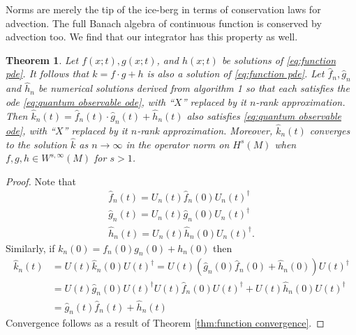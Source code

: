 \documentclass[12pt]{amsart}
\newtheorem{thm}{Theorem}[section]
\begin{document}
Norms are merely the tip of the ice-berg in terms of conservation laws for advection.
The full Banach algebra of continuous function is conserved by advection too.
We find that our integrator has this property as well.
\begin{thm} \label{thm:algebra}
	Let $f(x;t),g(x;t)$, and $h(x;t)$ be solutions of \eqref{eq:function pde}.
	It follows that $k= f \cdot g + h $ is also a solution of \eqref{eq:function pde}.
	Let $\hat{f}_{n}, \hat{g}_{n}$ and $\hat{h}_{n}$ be numerical solutions derived from algorithm 1
	so that each satisfies the ode \eqref{eq:quantum observable ode}, with ``$X$'' replaced by it $n$-rank approximation.
	Then $\hat{k}_{n}(t) = \hat{f}_{n}(t) \cdot \hat{g}_{n}(t) + \hat{h}_{n}(t)$ also satisfies \eqref{eq:quantum observable ode}, with ``$X$'' replaced by it $n$-rank approximation.
	Moreover, $\hat{k}_{n}(t)$ converges to the solution $\hat{k}$ as $n \to \infty$ in the operator norm on $H^{s}(M)$ when $f,g,h \in W^{s,\infty}(M)$ for $s>1$.
\end{thm}
\begin{proof}
	Note that 
	\begin{align}
		\hat{f}_{n}(t) = U_{n}(t) \hat{f}_{n}(0) U_{n}(t)^{\dagger} \\
		\hat{g}_{n}(t) = U_{n}(t) \hat{g}_{n}(0) U_{n}(t)^{\dagger} \\
		\hat{h}_{n}(t) = U_{n}(t) \hat{h}_{n}(0) U_{n}(t)^{\dagger}.
	\end{align}
	Similarly, if $k_{n}(0) = f_{n}(0) g_{n}(0) + h_{n}(0)$ then
	\begin{align}
		\hat{k}_{n}(t) &= U(t) \hat{k}_{n}(0) U(t)^{\dagger} = U(t)\left( \hat{g}_{n}(0) \hat{f}_{n}(0) + \hat{h}_{n}(0) \right) U(t)^{\dagger} \\
			&= U(t) \hat{g}_{n}(0) U(t)^{\dagger} U(t) \hat{f}_{n}(0) U(t)^{\dagger} + U(t) \hat{h}_{n}(0) U(t)^{\dagger} \\
			&= \hat{g}_{n}(t) \hat{f}_{n}(t) + \hat{h}_{n}(t)
	\end{align}
	Convergence follows as a result of Theorem \ref{thm:function convergence}.
\end{proof}
\end{document}
